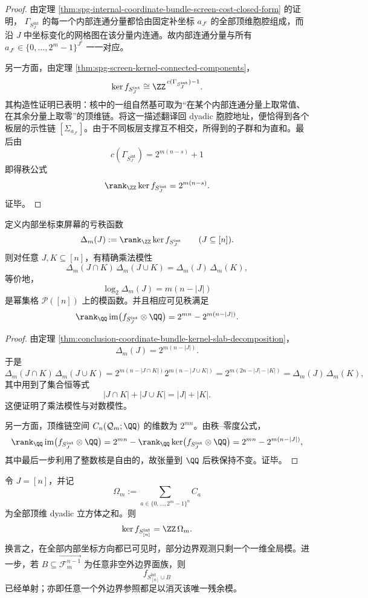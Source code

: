 \begin{proof}
由定理 \ref{thm:spg-internal-coordinate-bundle-screen-cost-closed-form} 的证明，
\(\Gamma_{S_J^{\mathrm{int}}}\) 的每一个内部连通分量都恰由固定补坐标 \(a_{J^c}\) 的全部顶维胞腔组成，而沿 \(J\) 中坐标变化的网格图在该分量内连通。故内部连通分量与所有 \(a_{J^c}\in\{0,\dots,2^m-1\}^{J^c}\) 一一对应。

另一方面，由定理 \ref{thm:spg-screen-kernel-connected-components}，
\[
\ker f_{S_J^{\mathrm{int}}}\cong \ZZ^{\,c(\Gamma_{S_J^{\mathrm{int}}})-1}.
\]
其构造性证明已表明：核中的一组自然基可取为“在某个内部连通分量上取常值、在其余分量上取零”的顶维链。将这一描述翻译回 dyadic 胞腔地址，便恰得到各个板层的示性链 \([\Sigma_{a_{J^c}}]\)。由于不同板层支撑互不相交，所得到的子群和为直和。最后由
\[
c(\Gamma_{S_J^{\mathrm{int}}})=2^{m(n-s)}+1
\]
即得秩公式
\[
\rank_{\ZZ}\ker f_{S_J^{\mathrm{int}}}=2^{m(n-s)}.
\]
证毕。
\end{proof}

\begin{theorem}[坐标束室中的对数模性与显式可见秩]\label{thm:conclusion-coordinate-bundle-logmodularity-visible-rank}
定义内部坐标束屏幕的亏秩函数
\[
\Delta_m(J):=\rank_{\ZZ}\ker f_{S_J^{\mathrm{int}}}
\qquad (J\subseteq [n]).
\]
则对任意 \(J,K\subseteq [n]\)，有精确乘法模性
\[
\Delta_m(J\cap K)\,\Delta_m(J\cup K)=\Delta_m(J)\,\Delta_m(K),
\]
等价地，
\[
\log_2\Delta_m(J)=m(n-|J|)
\]
是幂集格 \(\mathcal P([n])\) 上的模函数。并且相应可见秩满足
\[
\rank_{\QQ}\operatorname{im}\bigl(f_{S_J^{\mathrm{int}}}\otimes \QQ\bigr)
=
2^{mn}-2^{m(n-|J|)}.
\]
\end{theorem}

\begin{proof}
由定理 \ref{thm:conclusion-coordinate-bundle-kernel-slab-decomposition}，
\[
\Delta_m(J)=2^{m(n-|J|)}.
\]
于是
\[
\Delta_m(J\cap K)\,\Delta_m(J\cup K)
=
2^{m(n-|J\cap K|)}2^{m(n-|J\cup K|)}
=
2^{m(2n-|J|-|K|)}
=
\Delta_m(J)\,\Delta_m(K),
\]
其中用到了集合恒等式
\[
|J\cap K|+|J\cup K|=|J|+|K|.
\]
这便证明了乘法模性与对数模性。

另一方面，顶维链空间 \(C_n(\mathcal Q_m;\QQ)\) 的维数为 \(2^{mn}\)。由秩--零度公式，
\[
\rank_{\QQ}\operatorname{im}\bigl(f_{S_J^{\mathrm{int}}}\otimes \QQ\bigr)
=
2^{mn}-\rank_{\QQ}\ker\bigl(f_{S_J^{\mathrm{int}}}\otimes \QQ\bigr)
=
2^{mn}-2^{m(n-|J|)},
\]
其中最后一步利用了整数核是自由的，故张量到 \(\QQ\) 后秩保持不变。证毕。
\end{proof}

\begin{theorem}[全内部可见时的唯一残余全局模]\label{thm:conclusion-full-internal-visibility-unique-global-mode}
令 \(J=[n]\)，并记
\[
\Omega_m:=\sum_{a\in \{0,\dots,2^m-1\}^n} C_a
\]
为全部顶维 dyadic 立方体之和。则
\[
\ker f_{S_{[n]}^{\mathrm{int}}}=\ZZ\,\Omega_m.
\]
换言之，在全部内部坐标方向都已可见时，部分边界观测只剩一个一维全局模。进一步，若 \(B\subseteq \overrightarrow{\mathcal F_m^{n-1}}\) 为任意非空外边界面族，则
\[
f_{S_{[n]}^{\mathrm{int}}\cup B}
\]
已经单射；亦即任意一个外边界参照都足以消灭该唯一残余模。
\end{theorem}

